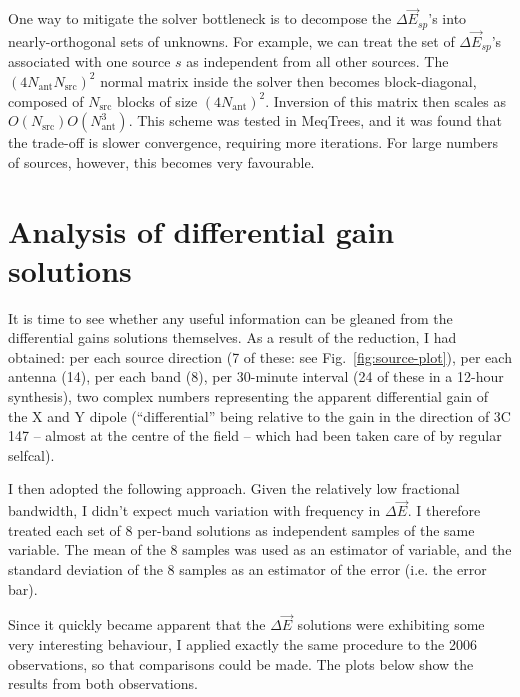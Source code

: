 \documentclass{aa}
\newcommand{\jones}[2]{\vec {#1}_{#2}}
\begin{document}
One way to mitigate the solver bottleneck is to decompose the $\Delta\jones{E}{sp}$'s into nearly-orthogonal sets of unknowns. For example, we can treat the set of $\Delta\jones{E}{sp}$'s associated with one source $s$ as independent from all other sources. The $(4N_\mathrm{ant}N_\mathrm{src})^2$ normal matrix inside the solver then becomes block-diagonal, composed of $N_\mathrm{src}$ blocks of size $(4N_\mathrm{ant})^2$. Inversion of this matrix then scales as $O(N_\mathrm{src})O(N_\mathrm{ant}^3)$. This scheme was tested in MeqTrees, and it was found that the trade-off is slower convergence, requiring more iterations. For large numbers of sources, however, this becomes very favourable.

\section{Analysis of differential gain solutions\label{sec:de-analysis}}

It is time to see whether any useful information can be gleaned from the differential gains solutions themselves. As a result of the reduction, I had obtained: per each source direction (7 of these: see Fig.~\ref{fig:source-plot}), per each antenna (14), per each band (8), per 30-minute interval (24 of these in a 12-hour synthesis), two complex numbers representing the apparent differential gain of the X and Y dipole (``differential'' being relative to the gain in the direction of 3C 147 -- almost at the centre of the field -- which had been taken care of by regular selfcal).

I then adopted the following approach. Given the relatively low fractional bandwidth, I didn't expect much variation with frequency in $\Delta\jones{E}{}$. I therefore treated each set of 8 per-band solutions as independent samples of the same variable. The mean of the 8 samples was used as an estimator of variable, and the standard deviation of the 8 samples as an estimator of the error (i.e. the error bar).

Since it quickly became apparent that the $\Delta\jones{E}{}$ solutions were exhibiting some very interesting behaviour, I applied exactly the same procedure to the 2006 observations, so that comparisons could be made. The plots below show the results from both observations. 
\end{document}
